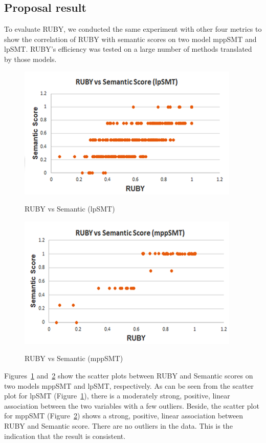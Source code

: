 \subsection{Proposal result}

To evaluate RUBY, we conducted the same experiment with other four
metrics to show the correlation of RUBY with semantic scores on two
model mppSMT and lpSMT. RUBY's efficiency was tested on a large number
of methods translated by those models.

\begin{figure}[t]
\caption{RUBY vs Semantic (lpSMT)}
\centering
\includegraphics{img/rubyvssem_lpSMT.png}
\label{fig:RubySemlpSMT}
\end{figure}

\begin{figure}[t]
\caption{RUBY vs Semantic (mppSMT)}
\centering
\includegraphics{img/rubyvssem_mppSMT.png}
\label{fig:RubySemMppSMT}
\end{figure}

Figures~\ref{fig:RubySemlpSMT} and~\ref{fig:RubySemMppSMT} show the
scatter plots between RUBY and Semantic scores on two models mppSMT
and lpSMT, respectively. As can be seen from the scatter plot for
lpSMT (Figure~\ref{fig:RubySemlpSMT}), there is a moderately strong,
positive, linear association between the two variables with a few
outliers.  Beside, the scatter plot for mppSMT
(Figure~\ref{fig:RubySemMppSMT}) shows a strong, positive, linear
association between RUBY and Semantic score. There are no outliers in
the data. This is the indication that the result is consistent.

